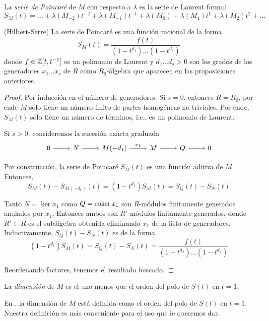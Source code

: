 \begin{definition}
La \textit{serie de Poincaré} de $M$ con respecto a $\lambda$ es la serie de Laurent formal
$$S_M(t) = \dots + \lambda(M_{-2}) t^{-2} + \lambda(M_{-1}) t^{-1} + \lambda(M_0) + \lambda(M_1) t^1 + \lambda(M_2) t^2 + \dots$$
\end{definition}

\begin{theorem}
(Hilbert-Serre) La serie de Poincaré es una función racional de la forma
$$S_M(t) = \frac {f(t)} {(1 - t^{d_1}) \dots (1 - t^{d_s})}$$
donde $f \in \mathbb Z[t, t^{-1}]$ es un polinomio de Laurent y $d_1 \dots d_s > 0$ son los grados de los generadores $x_1 \dots x_s$ de $R$ como $R_0$-álgebra que aparecen en las proposiciones anteriores.
\end{theorem}

\begin{proof}
Por inducción en el número de generadores. Si $s = 0$, entonces $R = R_0$, por ende $M$ sólo tiene un número finito de partes homogéneas no triviales. Por ende, $S_M(t)$ sólo tiene un número de términos, i.e., es un polinomio de Laurent.

Si $s > 0$, consideremos la sucesión exacta graduada
$$
\begin{tikzcd}
    0 \arrow[r] & N \arrow[r] & M(-d_1) \arrow[r, "x_1"] & M \arrow[r] & Q \arrow[r] & 0
\end{tikzcd}
$$

Por construcción, la serie de Poincaré $S_M(t)$ es una función aditiva de $M$. Entonces,
$$S_M(t) - S_{M(-d_1)}(t) = (1 - t^{d_1}) S_M(t) = S_Q(t) - S_N(t)$$

Tanto $N = \ker x_1$ como $Q = \operatorname{coker} x_1$ son $R$-módulos finitamente generados anulados por $x_1$. Entonces ambos son $R'$-módulos finitamente generados, donde $R' \subset R$ es el subálgebra obtenida eliminando $x_1$ de la lista de generadores. Inductivamente, $S_Q(t) - S_N(t)$ es de la forma
$$(1 - t^{d_1}) S_M(t) = S_Q(t) - S_N(t) = \frac {f(t)} {(1 - t^{d_2}) \dots (1 - t^{d_s})}$$

Reordenando factores, tenemos el resultado buscado.
\end{proof}

\begin{definition}
La \textit{dimensión} de $M$ es el uno menos que el orden del polo de $S(t)$ en $t = 1$.
\end{definition}

\begin{remark}
En \cite[p. 117]{atiyah}, la dimensión de $M$ está definida como el orden del polo de $S(t)$ en $t = 1$. Nuestra definición es más conveniente para el uso que le queremos dar.
\end{remark}

